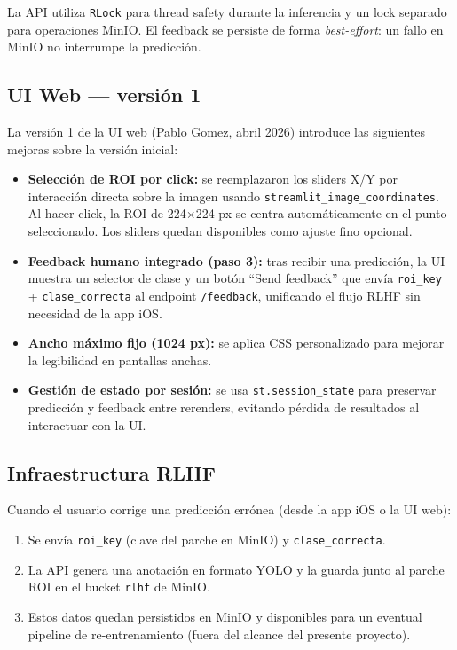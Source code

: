 \documentclass[12pt,a4paper]{article}
\begin{document}
La API utiliza \texttt{RLock} para thread safety durante la inferencia y un lock
separado para operaciones MinIO. El feedback se persiste de forma \textit{best-effort}:
un fallo en MinIO no interrumpe la predicción.

\subsection{UI Web — versión 1}

La versión 1 de la UI web (Pablo Gomez, abril 2026) introduce las siguientes mejoras
sobre la versión inicial:

\begin{itemize}
  \item \textbf{Selección de ROI por click:} se reemplazaron los sliders X/Y por
        interacción directa sobre la imagen usando \texttt{streamlit\_image\_coordinates}.
        Al hacer click, la ROI de 224$\times$224 px se centra automáticamente en el punto
        seleccionado. Los sliders quedan disponibles como ajuste fino opcional.
  \item \textbf{Feedback humano integrado (paso 3):} tras recibir una predicción, la UI
        muestra un selector de clase y un botón ``Send feedback'' que envía
        \texttt{roi\_key} + \texttt{clase\_correcta} al endpoint \texttt{/feedback},
        unificando el flujo RLHF sin necesidad de la app iOS.
  \item \textbf{Ancho máximo fijo (1024 px):} se aplica CSS personalizado para mejorar
        la legibilidad en pantallas anchas.
  \item \textbf{Gestión de estado por sesión:} se usa \texttt{st.session\_state} para
        preservar predicción y feedback entre rerenders, evitando pérdida de resultados
        al interactuar con la UI.
\end{itemize}

\subsection{Infraestructura RLHF}

Cuando el usuario corrige una predicción errónea (desde la app iOS o la UI web):
\begin{enumerate}
  \item Se envía \texttt{roi\_key} (clave del parche en MinIO) y \texttt{clase\_correcta}.
  \item La API genera una anotación en formato YOLO y la guarda junto al parche ROI
        en el bucket \texttt{rlhf} de MinIO.
  \item Estos datos quedan persistidos en MinIO y disponibles para un eventual pipeline de re-entrenamiento (fuera del alcance del presente proyecto).
\end{enumerate}
\end{document}

